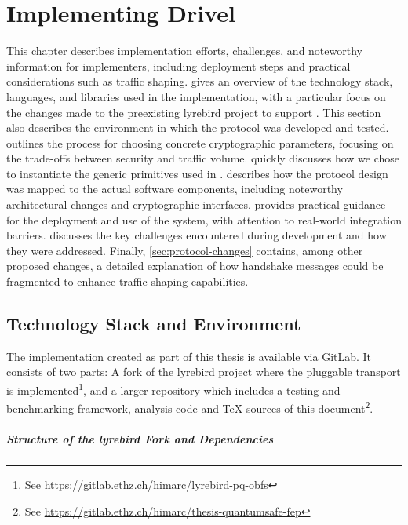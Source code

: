 \chapter{Implementing Drivel}\label{ch:implementation}

This chapter describes implementation efforts, challenges, and noteworthy information for implementers, including deployment steps and practical considerations such as traffic shaping.
 gives an overview of the technology stack, languages, and libraries used in the implementation, with a particular focus on the changes made to the preexisting lyrebird project \cite{lyrebird} to support \drivel{}. This section also describes the environment in which the protocol was developed and tested.
 outlines the process for choosing concrete cryptographic parameters, focusing on the trade-offs between security and traffic volume.
 quickly discusses how we chose to instantiate the generic primitives used in \drivel{}.
 describes how the protocol design was mapped to the actual software components, including noteworthy architectural changes and cryptographic interfaces.
 provides practical guidance for the deployment and use of the system, with attention to real-world integration barriers.
 discusses the key challenges encountered during development and how they were addressed.
Finally, \cref{sec:protocol-changes} contains, among other proposed changes, a detailed explanation of how handshake messages could be fragmented to enhance traffic shaping capabilities.

\section{Technology Stack and Environment} \label{sec:tech-stack}

The implementation created as part of this thesis is available via GitLab. It consists of two parts: A fork of the lyrebird project \cite{lyrebird} where the \drivel{} pluggable transport is implemented\footnote{See \url{https://gitlab.ethz.ch/himarc/lyrebird-pq-obfs}}, and a larger repository which includes a testing and benchmarking framework, analysis code and TeX sources of this document\footnote{See \url{https://gitlab.ethz.ch/himarc/thesis-quantumsafe-fep}}.

\paragraph{Structure of the lyrebird Fork and Dependencies}

